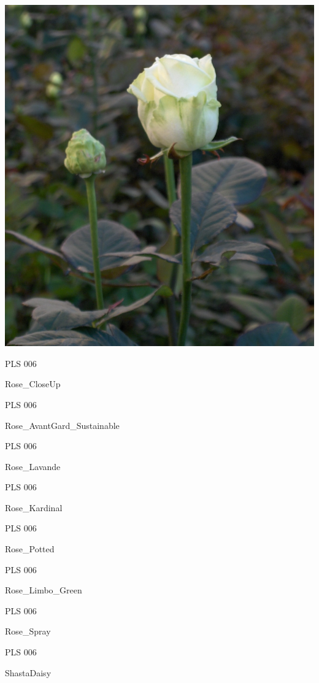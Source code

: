 \documentclass{article}
\begin{document}
\begin{center}
\includegraphics[height=0.925\paperheight]{../Rose_Akito.jpg}
\end{center}
\newpage

\noindent  PLS 006
\vfill
\centerline{{\huge Rose\_CloseUp }}
\vfill
\newpage

\noindent  PLS 006
\vfill
\centerline{{\huge Rose\_AvantGard\_Sustainable }}
\vfill
\newpage

\noindent  PLS 006
\vfill
\centerline{{\huge Rose\_Lavande }}
\vfill
\newpage

\noindent  PLS 006
\vfill
\centerline{{\huge Rose\_Kardinal }}
\vfill
\newpage

\noindent  PLS 006
\vfill
\centerline{{\huge Rose\_Potted }}
\vfill
\newpage

\noindent  PLS 006
\vfill
\centerline{{\huge Rose\_Limbo\_Green }}
\vfill
\newpage

\noindent  PLS 006
\vfill
\centerline{{\huge Rose\_Spray }}
\vfill
\newpage

\noindent  PLS 006
\vfill
\centerline{{\huge ShastaDaisy }}
\vfill
\newpage
\end{document}
